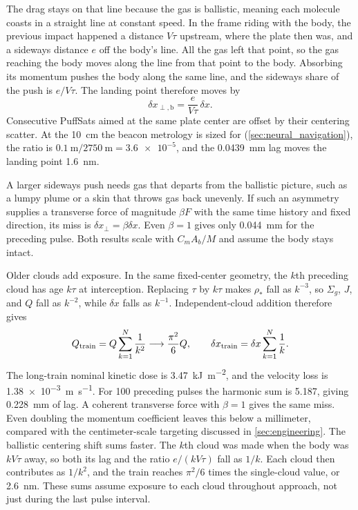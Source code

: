 \documentclass{article}
\begin{document}
The drag stays on that line because the gas is ballistic, meaning each molecule coasts in a straight line at constant speed. In the frame riding with the body, the previous impact happened a distance $V\tau$ upstream, where the plate then was, and a sideways distance $e$ off the body's line. All the gas left that point, so the gas reaching the body moves along the line from that point to the body. Absorbing its momentum pushes the body along the same line, and the sideways share of the push is $e/V\tau$. The landing point therefore moves by
\begin{equation}\label{eq:leo_centering}
\delta x_{\perp,\mathrm{b}}=\frac{e}{V\tau}\,\delta x.
\end{equation}
Consecutive PuffSats aimed at the same plate center are offset by their centering scatter. At the \SI{10}{\centi\meter} the beacon metrology is sized for (\autoref{sec:neural_navigation}), the ratio is $\SI{0.1}{\meter}/\SI{2750}{\meter}=\num{3.6e-5}$, and the \SI{0.0439}{\milli\meter} lag moves the landing point \SI{1.6}{\nano\meter}.

A larger sideways push needs gas that departs from the ballistic picture, such as a lumpy plume or a skin that throws gas back unevenly. If such an asymmetry supplies a transverse force of magnitude $\beta F$ with the same time history and fixed direction, its miss is $\delta x_\perp=\beta\delta x$. Even $\beta=1$ gives only \SI{0.044}{\milli\meter} for the preceding pulse. Both results scale with $C_mA_b/M$ and assume the body stays intact.

Older clouds add exposure. In the same fixed-center geometry, the $k$th preceding cloud has age $k\tau$ at interception. Replacing $\tau$ by $k\tau$ makes $\rho_*$ fall as $k^{-3}$, so $\Sigma_g$, $J$, and $Q$ fall as $k^{-2}$, while $\delta x$ falls as $k^{-1}$. Independent-cloud addition therefore gives
\begin{equation}\label{eq:leo_plume_train}
Q_{\rm train}=Q\sum_{k=1}^N\frac1{k^2}
\longrightarrow\frac{\pi^2}{6}Q,
\qquad
\delta x_{\rm train}=\delta x\sum_{k=1}^N\frac1k.
\end{equation}
The long-train nominal kinetic dose is \SI{3.47}{\kilo\joule\per\square\meter}, and the velocity loss is \SI{1.38e-3}{\meter\per\second}. For 100 preceding pulses the harmonic sum is 5.187, giving \SI{0.228}{\milli\meter} of lag. A coherent transverse force with $\beta=1$ gives the same miss. Even doubling the momentum coefficient leaves this below a millimeter, compared with the centimeter-scale targeting discussed in \autoref{sec:engineering}. The ballistic centering shift sums faster. The $k$th cloud was made when the body was $kV\tau$ away, so both its lag and the ratio $e/(kV\tau)$ fall as $1/k$. Each cloud then contributes as $1/k^2$, and the train reaches $\pi^2/6$ times the single-cloud value, or \SI{2.6}{\nano\meter}. These sums assume exposure to each cloud throughout approach, not just during the last pulse interval.
\end{document}
